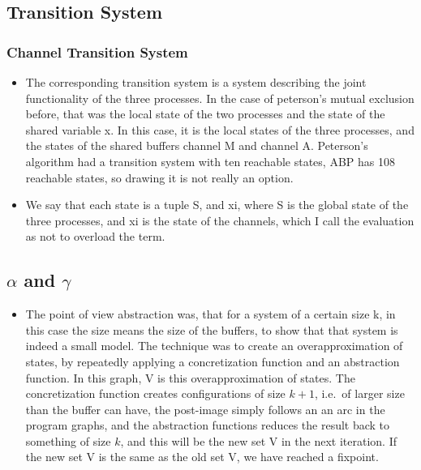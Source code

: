 \documentclass[handout]{beamer}
\begin{document}
\begin{footnotesize}
\subsection{Transition System}
\begin{frame}
  \frametitle{Channel Transition System}
  \begin{itemize}
  \item
The corresponding transition system is a system describing the joint functionality of the three processes. In the case of peterson's mutual exclusion before, that was the local state of the two processes and the state of the shared variable x. In this case, it is the local states of the three processes, and the states of the shared buffers channel M and channel A. Peterson's algorithm had a transition system with ten reachable states, ABP has 108 reachable states, so drawing it is not really an option.
\item
We say that each state is a tuple S, and xi, where S is the global state of the three processes, and xi is the state of the channels, which I call the evaluation as not to overload the term.
  \end{itemize}
\end{frame}

\subsection{$\alpha$ and $\gamma$}
\begin{frame}
\begin{itemize}
\item
The point of view abstraction was, that for a system of a certain size k, in this case the size means the size of the buffers, to show that that system is indeed a small model. The technique was to create an overapproximation of states, by repeatedly applying a concretization function and an abstraction function. In this graph, V is this overapproximation of states. The concretization function creates configurations of size $k+1$, i.e.\ of larger size than the buffer can have, the post-image simply follows an an arc in the program graphs, and the abstraction functions reduces the result back to something of size $k$, and this will be the new set V in the next iteration. If the new set V is the same as the old set V, we have reached a fixpoint.
\end{itemize}
\end{frame}


\end{footnotesize}
\end{document}

